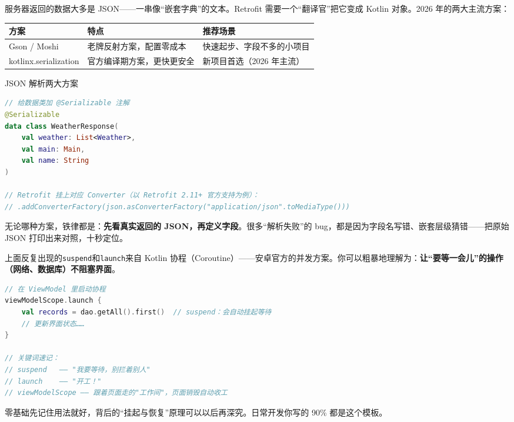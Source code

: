 
服务器返回的数据大多是 JSON——一串像“嵌套字典”的文本。Retrofit 需要一个“翻译官”把它变成 Kotlin 对象。2026 年的两大主流方案：

\begin{center}
\begin{tabularx}{\linewidth}{|X|X|X|}
\hline
\textbf{方案} & \textbf{特点} & \textbf{推荐场景} \tabularnewline
\hline
Gson / Moshi & 老牌反射方案，配置零成本 & 快速起步、字段不多的小项目 \tabularnewline
kotlinx.serialization & 官方编译期方案，更快更安全 & 新项目首选（2026 年主流） \tabularnewline
\hline
\end{tabularx}
\end{center}

\begin{center}\small\color{gray}JSON 解析两大方案\end{center}

\begin{lstlisting}[language=Kotlin]
// 给数据类加 @Serializable 注解
@Serializable
data class WeatherResponse(
    val weather: List<Weather>,
    val main: Main,
    val name: String
)

// Retrofit 挂上对应 Converter（以 Retrofit 2.11+ 官方支持为例）：
// .addConverterFactory(json.asConverterFactory("application/json".toMediaType()))
\end{lstlisting}

无论哪种方案，铁律都是：\textbf{先看真实返回的 JSON，再定义字段}。很多“解析失败”的 bug，都是因为字段名写错、嵌套层级猜错——把原始 JSON 打印出来对照，十秒定位。



上面反复出现的\texttt{suspend}和\texttt{launch}来自 Kotlin 协程（Coroutine）——安卓官方的并发方案。你可以粗暴地理解为：\textbf{让“要等一会儿”的操作（网络、数据库）不阻塞界面}。

\begin{lstlisting}[language=Kotlin]
// 在 ViewModel 里启动协程
viewModelScope.launch {
    val records = dao.getAll().first()  // suspend：会自动挂起等待
    // 更新界面状态……
}

// 关键词速记：
// suspend   —— "我要等待，别拦着别人"
// launch    —— "开工！"
// viewModelScope —— 跟着页面走的"工作间"，页面销毁自动收工
\end{lstlisting}

零基础先记住用法就好，背后的“挂起与恢复”原理可以以后再深究。日常开发你写的 90\% 都是这个模板。

